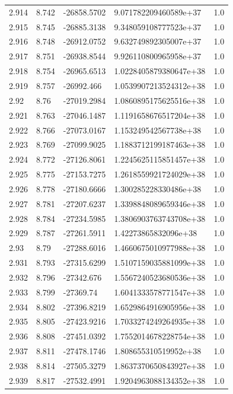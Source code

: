 \begin{tabular}{lllll}
2.914 & 8.742 & -26858.5702 & 9.071782209460589e+37 & 1.0 \\
2.915 & 8.745 & -26885.3138 & 9.348059108777523e+37 & 1.0 \\
2.916 & 8.748 & -26912.0752 & 9.632749892305007e+37 & 1.0 \\
2.917 & 8.751 & -26938.8544 & 9.926110800965958e+37 & 1.0 \\
2.918 & 8.754 & -26965.6513 & 1.0228405879380647e+38 & 1.0 \\
2.919 & 8.757 & -26992.466 & 1.0539907213524312e+38 & 1.0 \\
2.92 & 8.76 & -27019.2984 & 1.0860895175625516e+38 & 1.0 \\
2.921 & 8.763 & -27046.1487 & 1.1191658676517204e+38 & 1.0 \\
2.922 & 8.766 & -27073.0167 & 1.153249542567738e+38 & 1.0 \\
2.923 & 8.769 & -27099.9025 & 1.1883712199187463e+38 & 1.0 \\
2.924 & 8.772 & -27126.8061 & 1.2245625115851457e+38 & 1.0 \\
2.925 & 8.775 & -27153.7275 & 1.2618559921724029e+38 & 1.0 \\
2.926 & 8.778 & -27180.6666 & 1.300285228330486e+38 & 1.0 \\
2.927 & 8.781 & -27207.6237 & 1.3398848089659346e+38 & 1.0 \\
2.928 & 8.784 & -27234.5985 & 1.3806903763743708e+38 & 1.0 \\
2.929 & 8.787 & -27261.5911 & 1.42273865832096e+38 & 1.0 \\
2.93 & 8.79 & -27288.6016 & 1.4660675010977988e+38 & 1.0 \\
2.931 & 8.793 & -27315.6299 & 1.5107159035881099e+38 & 1.0 \\
2.932 & 8.796 & -27342.676 & 1.5567240523680536e+38 & 1.0 \\
2.933 & 8.799 & -27369.74 & 1.6041333578771547e+38 & 1.0 \\
2.934 & 8.802 & -27396.8219 & 1.6529864916905956e+38 & 1.0 \\
2.935 & 8.805 & -27423.9216 & 1.7033274249264935e+38 & 1.0 \\
2.936 & 8.808 & -27451.0392 & 1.7552014678228754e+38 & 1.0 \\
2.937 & 8.811 & -27478.1746 & 1.808655310519952e+38 & 1.0 \\
2.938 & 8.814 & -27505.3279 & 1.8637370650843927e+38 & 1.0 \\
2.939 & 8.817 & -27532.4991 & 1.9204963088134352e+38 & 1.0 \\

\end{tabular}
